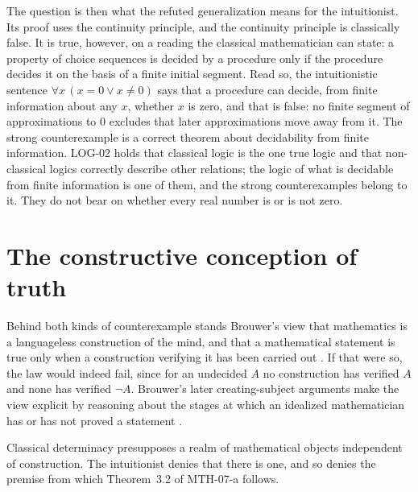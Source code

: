 \documentclass{situationist-preprint}
\begin{document}
The question is then what the refuted generalization means for the intuitionist. Its proof uses the continuity principle, and the continuity principle is classically false. It is true, however, on a reading the classical mathematician can state: a property of choice sequences is decided by a procedure only if the procedure decides it on the basis of a finite initial segment. Read so, the intuitionistic sentence $\forall x\,(x = 0 \vee x \neq 0)$ says that a procedure can decide, from finite information about any $x$, whether $x$ is zero, and that is false: no finite segment of approximations to $0$ excludes that later approximations move away from it. The strong counterexample is a correct theorem about decidability from finite information. LOG-02 holds that classical logic is the one true logic and that non-classical logics correctly describe other relations; the logic of what is decidable from finite information is one of them, and the strong counterexamples belong to it. They do not bear on whether every real number is or is not zero.

\section{The constructive conception of truth}\label{s:truth}

Behind both kinds of counterexample stands Brouwer's view that mathematics is a languageless construction of the mind, and that a mathematical statement is true only when a construction verifying it has been carried out \citep{Brouwer1907,Brouwer1908}. If that were so, the law would indeed fail, since for an undecided $A$ no construction has verified $A$ and none has verified $\neg A$. Brouwer's later creating-subject arguments make the view explicit by reasoning about the stages at which an idealized mathematician has or has not proved a statement \citep{TroelstraVanDalen1988}.

\begin{objection}
Classical determinacy presupposes a realm of mathematical objects independent of construction. The intuitionist denies that there is one, and so denies the premise from which Theorem~3.2 of MTH-07-a follows.
\end{objection}
\end{document}

